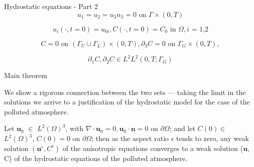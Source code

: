 \documentclass{beamer}
\begin{document}
\begin{frame}{Hydrostatic equations - Part 2}
    \[ u_1 = u_2 = u_3 n_3 = 0 \text{ on } \Gamma \times (0,T) \]
    
    \[ u_i (\cdot, t=0) = u_{0 i}, C (\cdot, t=0) = C_0 \text{ in } \Omega, \text{$i$ = 1,2} \]
    
    $$C = 0 \text{ on } ( \Gamma_U \cup \Gamma_L) \times (0,T),  \partial_3 C = 0 \text{ on } \Gamma_G \times (0,T),$$
    
    $$ \partial_1 C, \partial_2 C \in L^2 L^2 (0,T; \Gamma_G) $$
  
\end{frame}

\begin{frame}{Main theorem}

  We show a rigorous connection between the two sets --- taking the limit in the solutions we arrive to a justification of the hydrostatic model for the case of the polluted atmosphere.

  \begin{theorem}

  Let $\mathbf{u}_0$ $\in$ $L^2 (\Omega)^3$, with $\nabla \cdot \mathbf{u}_0 = 0, \mathbf{u}_0 \cdot \mathbf{n} = 0$ on $\partial \Omega$; and let $C(0)\in$ $L^2 (\Omega)^3$, $C(0) = 0$ on $ \partial \Omega$; then as the aspect ratio $\epsilon$ tends to zero, any weak solution $(\mathbf{u}^\epsilon, C^\epsilon)$ of the anisotropic equations converges to a weak solution ($\mathbf{u}$, C) of the hydrostatic equations of the polluted atmosphere.

  \end{theorem}

\end{frame}
\end{document}

